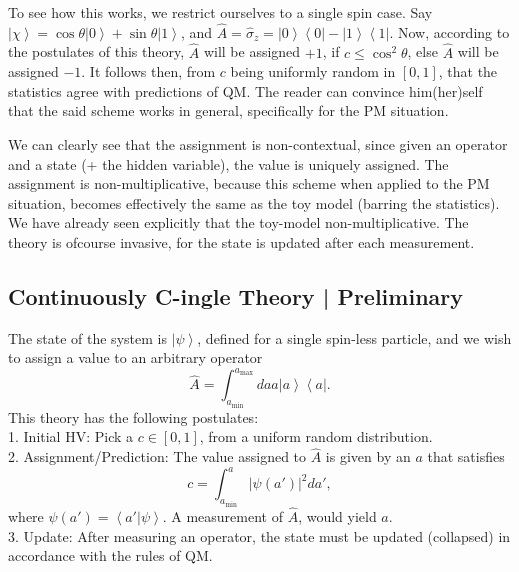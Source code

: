 To see how this works, we restrict ourselves to a single spin case.
Say $\left|\chi\right\rangle =\cos\theta\left|0\right\rangle +\sin\theta\left|1\right\rangle $,
and $\hat{A}=\hat{\sigma}_{z}=\left|0\right\rangle \left\langle 0\right|-\left|1\right\rangle \left\langle 1\right|$.
Now, according to the postulates of this theory, $\hat{A}$ will be
assigned $+1$, if $c\le\cos^{2}\theta$, else $\hat{A}$ will be
assigned $-1$. It follows then, from $c$ being uniformly random
in $[0,1]$, that the statistics agree with predictions of QM. The
reader can convince him(her)self that the said scheme works in general,
specifically for the PM situation. 

We can clearly see that the assignment is non-contextual, since given
an operator and a state (+ the hidden variable), the value is uniquely
assigned. The assignment is non-multiplicative, because this scheme
when applied to the PM situation, becomes effectively the same as
the toy model (barring the statistics). We have already seen explicitly
that the toy-model non-multiplicative. The theory is ofcourse invasive,
for the state is updated after each measurement.


\subsection{Continuously C-ingle Theory | Preliminary}

The state of the system is $\left|\psi\right\rangle $, defined for
a single spin-less particle, and we wish to assign a value to an arbitrary
operator 
\[
\hat{A}=\int_{a_{\text{min}}}^{a_{\text{max}}}daa\left|a\right\rangle \left\langle a\right|.
\]
This theory has the following postulates: \\
1. Initial HV: Pick a $c\in[0,1]$, from a uniform random distribution.\\
2. Assignment/Prediction: The value assigned to $\hat{A}$ is given
by an $a$ that satisfies 
\[
c=\int_{a_{\text{min}}}^{a}\left|\psi(a')\right|^{2}da',
\]
where $\psi(a')=\left\langle a'|\psi\right\rangle $. A measurement
of $\hat{A}$, would yield $a$.\\
3. Update: After measuring an operator, the state must be updated
(collapsed) in accordance with the rules of QM.

